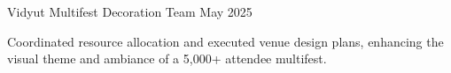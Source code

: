 \resumeProject
  {Vidyut Multifest}
  {Decoration Team}
  {May 2025}
  {{} }
\resumeItemListStart
  \item Coordinated resource allocation and executed venue design plans, enhancing the visual theme and ambiance of a 5,000+ attendee multifest.
\resumeItemListEnd